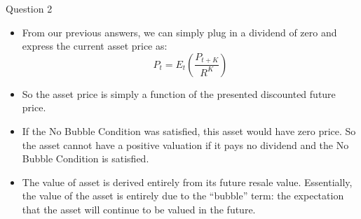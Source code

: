 \documentclass[a4paper]{article}
\newif\IfInSansMode
\begin{document}
\begin{questionbox}{Question 2}
\begin{enumerate}[(a)]
\begin{explanationbox}
\begin{itemize}
					\item From our previous answers, we can simply plug in a dividend of zero and express the current asset price as:
					\[
						P_t = E_t \left( \frac{P_{t+K}}{R^K} \right)
					\]
					\item So the asset price is simply a function of the presented discounted future price.
					\item If the No Bubble Condition was satisﬁed, this asset would have zero price. So the asset cannot have a positive valuation if it pays no dividend and the No Bubble Condition is satisﬁed.
					\item The value of asset is derived entirely from its future resale value. Essentially, the value of the asset is entirely due to the ``bubble'' term: the expectation that the asset will continue to be valued in the future.
				\end{itemize}
			\end{explanationbox}
		\end{enumerate}
	\end{questionbox}
\end{document}
